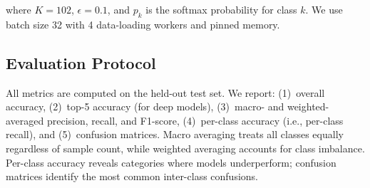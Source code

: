 \noindent where $K = 102$, $\epsilon = 0.1$, and $p_k$ is the softmax probability for class $k$. We use batch size 32 with 4 data-loading workers and pinned memory.

\subsection{Evaluation Protocol}

All metrics are computed on the held-out test set. We report: (1)~overall accuracy, (2)~top-5 accuracy (for deep models), (3)~macro- and weighted-averaged precision, recall, and F1-score, (4)~per-class accuracy (i.e., per-class recall), and (5)~confusion matrices. Macro averaging treats all classes equally regardless of sample count, while weighted averaging accounts for class imbalance. Per-class accuracy reveals categories where models underperform; confusion matrices identify the most common inter-class confusions.
